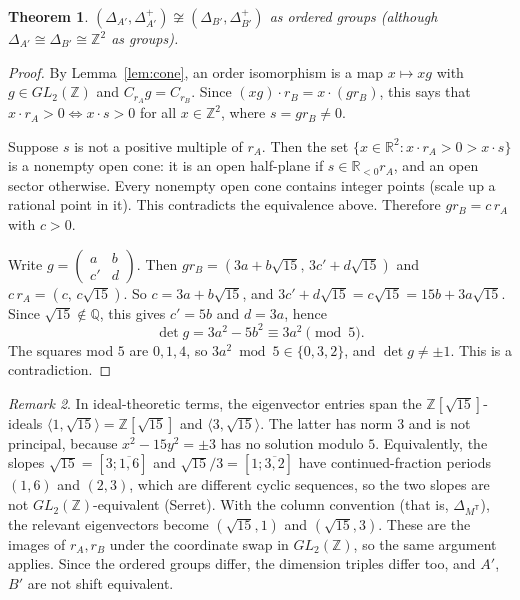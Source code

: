 \documentclass[11pt]{article}
\newtheorem{theorem}{Theorem}
\theoremstyle{definition}
\theoremstyle{remark}
\newtheorem{remark}[theorem]{Remark}
\newcommand{\Z}{\mathbb{Z}}
\newcommand{\Q}{\mathbb{Q}}
\begin{document}
\begin{theorem}\label{thm:irr}
$(\Delta_{A'},\Delta_{A'}^+)\not\cong(\Delta_{B'},\Delta_{B'}^+)$ as ordered
groups (although $\Delta_{A'}\cong\Delta_{B'}\cong\Z^2$ as groups).
\end{theorem}
\begin{proof}
By Lemma~\ref{lem:cone}, an order isomorphism is a map $x\mapsto xg$ with
$g\in GL_2(\Z)$ and $C_{r_A}g=C_{r_B}$. Since $(xg)\cdot r_B=x\cdot(gr_B)$, this
says that $x\cdot r_A>0\iff x\cdot s>0$ for all $x\in\Z^2$, where $s=gr_B\neq0$.

Suppose $s$ is not a positive multiple of $r_A$. Then the set
$\{x\in\mathbb R^2:x\cdot r_A>0>x\cdot s\}$ is a nonempty open cone: it is an
open half-plane if $s\in\mathbb R_{<0}r_A$, and an open sector otherwise. Every
nonempty open cone contains integer points (scale up a rational point in it). This
contradicts the equivalence above. Therefore $gr_B=c\,r_A$ with $c>0$.

Write $g=\left(\begin{smallmatrix}a&b\\c'&d\end{smallmatrix}\right)$. Then
$gr_B=(3a+b\sqrt{15},\,3c'+d\sqrt{15})$ and
$c\,r_A=(c,\,c\sqrt{15})$. So $c=3a+b\sqrt{15}$, and
$3c'+d\sqrt{15}=c\sqrt{15}=15b+3a\sqrt{15}$. Since $\sqrt{15}\notin\Q$, this
gives $c'=5b$ and $d=3a$, hence
\[
\det g=3a^2-5b^2\equiv3a^2\pmod5.
\]
The squares mod $5$ are $0,1,4$, so $3a^2\bmod5\in\{0,3,2\}$, and
$\det g\neq\pm1$. This is a contradiction.
\end{proof}

\begin{remark}
In ideal-theoretic terms, the eigenvector entries span the $\Z[\sqrt{15}]$-ideals
$\langle1,\sqrt{15}\rangle=\Z[\sqrt{15}]$ and $\langle3,\sqrt{15}\rangle$.
The latter has norm $3$ and is not principal, because $x^2-15y^2=\pm3$ has no
solution modulo $5$. Equivalently, the slopes $\sqrt{15}=[3;\overline{1,6}]$ and
$\sqrt{15}/3=[1;\overline{3,2}]$ have continued-fraction periods $(1,6)$ and
$(2,3)$, which are different cyclic sequences, so the two slopes are not
$GL_2(\Z)$-equivalent (Serret). With the column convention (that is,
$\Delta_{M^{\mathsf T}}$), the relevant eigenvectors become $(\sqrt{15},1)$ and
$(\sqrt{15},3)$. These are the images of $r_A,r_B$ under the coordinate swap in
$GL_2(\Z)$, so the same argument applies. Since the ordered groups differ, the
dimension triples differ too, and $A'$, $B'$ are not shift equivalent.
\end{remark}
\end{document}
